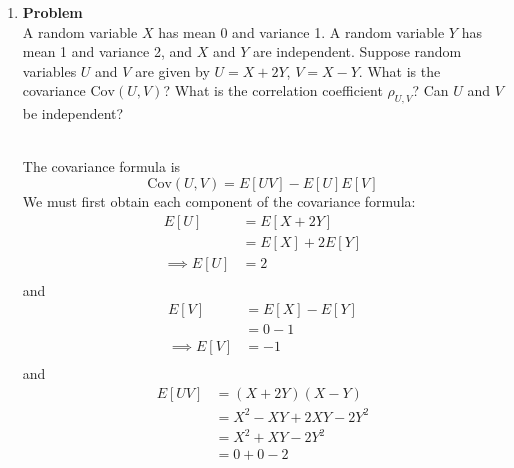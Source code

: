 \documentclass[12pt]{article}
\newenvironment{Ex}{\textbf{Problem}\vspace{.75em}\\}{}
\begin{document}
\begin{enumerate}
\begin{Ex}
\begin{solution}
\begin{equation}
\begin{aligned}
          \implies f_Z(z) &= \sum_{x}f_Y(z-x)p_X(x) \\
        \end{aligned}
      \end{equation}
    \end{solution}
  \end{Ex}
\item
  \begin{Ex}
    A random variable $X$ has mean 0 and variance 1. A random variable
    $Y$ has mean 1 and variance 2, and $X$ and $Y$ are
    independent. Suppose random variables $U$ and $V$ are given by
    $U=X+2Y$, $V = X-Y$. What is the covariance $\text{Cov}(U,V)$?
    What is the correlation coefficient $\rho_{U,V}$? Can $U$ and $V$
    be independent?
    \begin{solution} \hfill \vspace{.75em} \\
      The covariance formula is
      \begin{equation}
        \label{eq:4-cov}
        \text{Cov}(U,V) = E[UV] - E[U]E[V]
      \end{equation}
      We must first obtain each component of the covariance formula:
      \begin{equation}
        \label{eq:4-e-u}
        \begin{aligned}
          E[U] &= E[X+2Y] \\
          &= E[X] + 2E[Y] \\
          \implies E[U] &= 2 \\
        \end{aligned}
      \end{equation}
      and
      \begin{equation}
        \label{eq:4-e-v}
        \begin{aligned}
          E[V] &= E[X]-E[Y] \\
          &= 0-1 \\
          \implies E[V] &= -1 \\
        \end{aligned}
      \end{equation}
      and
      \begin{equation}
        \label{eq:4-e-uv}
        \begin{aligned}
          E[UV] &= (X+2Y)(X-Y) \\
          &= X^2 - XY + 2XY - 2Y^2 \\
          &= X^2 + XY - 2Y^2 \\
          &= 0 + 0 - 2 \\

\end{aligned}
\end{equation}
\end{solution}
\end{Ex}
\end{enumerate}
\end{document}
